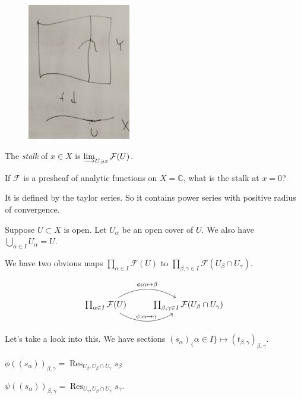 \documentclass{article}
\theoremstyle{definition}
\begin{document}
    \begin{figure}[H]
        \centering
        \includegraphics[width=0.4\textwidth]{img/section}
        \caption{}
    \end{figure}

    The \textit{stalk} of \(x\in X\) is \(\varinjlim_{U \ni x} \mathcal{F}(U)\).

    If \(\mathcal{F}\) is a presheaf of analytic functions on \(X = \mathbb{C}\), what is the stalk at \(x = 0\)?

    It is defined by the taylor series. So it contains power series with positive radius of convergence.

    Suppose \(U \subset X\) is open. Let \(U_\alpha\) be an open cover of \(U\). We also have \(\bigcup_{\alpha \in I} U_\alpha = U\).

    We have two obvious maps \(\prod_{\alpha \in I} \mathcal{F}(U)\) to \(\prod_{\beta ,\gamma \in I} \mathcal{F} (U_\beta \cap U_\gamma)\).

    \[
        \begin{tikzcd}
            \prod_{\alpha \in I} \mathcal{F}(U) \ar[r, bend left, "\phi : \alpha \mapsto \beta"] \ar[r, bend right, "\psi : \alpha \mapsto \gamma"] & \prod_{\beta, \gamma\in I} \mathcal{F}(U_\beta \cap U_\gamma)
        \end{tikzcd}
    \]

    Let's take a look into this. We have sections \((s_\alpha)_\{ \alpha \in I \} \mapsto (t_{\beta, \gamma})_{\beta, \gamma}\).

    \(\phi((s_\alpha))_{\beta,\gamma} = \operatorname{Res}_{U_\beta, U_\beta \cap U_\gamma} s_\beta \)
    
    \(\psi((s_\alpha))_{\beta ,\gamma} = \operatorname{Res}_{U_\gamma, U_\beta \cap U_\gamma} s_\gamma\).
    
    
\end{document}
